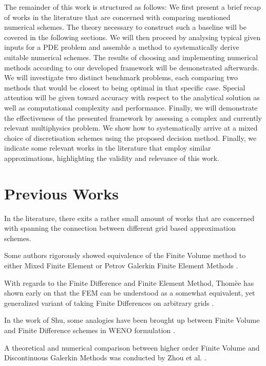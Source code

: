 \documentclass[sn-mathphys,Numbered]{sn-jnl}%
\theoremstyle{thmstyleone}%
\theoremstyle{thmstyletwo}%
\theoremstyle{thmstylethree}%
\begin{document}
The remainder of this work is structured as follows:
We first present a brief recap of works in the literature that are concerned with comparing mentioned numerical schemes.
The theory necessary to construct such a baseline will be covered in the following sections.
We will then proceed by analysing typical given inputs for a PDE problem and assemble a method to systematically derive suitable numerical schemes.
The results of choosing and implementing numerical methods according to our developed framework will be demonstrated afterwards.
We will investigate two distinct benchmark problems, each comparing two methods that would be closest to being optimal in that specific case.
Special attention will be given toward accuracy with respect to the analytical solution as well as computational complexity and performance.
Finally, we will demonstrate the effectiveness of the presented framework by assessing a complex and currently relevant multiphysics problem.
We show how to systematically arrive at a mixed choice of discretisation schemes using the proposed decision method. Finally, we indicate some relevant works in the literature that employ similar approximations, highlighting the validity and relevance of this work.

\section{Previous Works}

In the literature, there exits a rather small amount of works that are concerned with spanning the connection between different grid based approximation schemes.

Some authors rigorously showed equivalence of the Finite Volume method to either Mixed Finite Element \cite{barangerConnectionFiniteVolume1996} or Petrov Galerkin Finite Element Methods \cite{yeRelationshipFiniteVolume2001,idelsohnFiniteVolumesFinite1994}.

With regards to the Finite Difference and Finite Element Method, Thomèe has shown early on that the FEM can be understood as a somewhat equivalent, yet generalized variant of taking Finite Differences on arbitrary grids \cite{thomeeFiniteDifferenceFinite1984}.

In the work of Shu, some analogies have been brought up between Finite Volume and Finite Difference schemes in WENO formulation \cite{shuHighorderFiniteDifference2003}.

A theoretical and numerical comparison between higher order Finite Volume and Discontinuous Galerkin Methods was conducted by Zhou et al. \cite{zhouNumericalComparisonWENO2001}.
\end{document}
